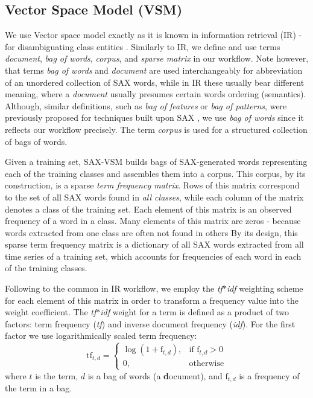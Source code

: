 \documentclass{llncs}
\begin{document}
\subsection{Vector Space Model (VSM)}
We use Vector space model exactly as it is known in information retrieval (IR) - 
for disambiguating class entities \cite{salton}. Similarly to IR, we define and use 
terms \textit{document}, \textit{bag of words}, \textit{corpus}, and 
\textit{sparse matrix} in our workflow. 
Note however, that terms \textit{bag of words} and \textit{document} are used 
interchangeably for abbreviation of an unordered collection of SAX words, while 
in IR these usually bear different meaning, where a \textit{document} usually 
presumes certain words ordering (semantics). 
Although, similar definitions, such as \textit{bag of features} or 
\textit{bag of patterns}, were previously proposed for techniques built upon 
SAX \cite{bag_patterns}, we use \textit{bag of words} since it reflects our 
workflow precisely. The term \textit{corpus} is used for a structured collection 
of bags of words. 

Given a training set, SAX-VSM builds bags of SAX-generated words representing 
each of the training classes and assembles them into a corpus. 
This corpus, by its construction, is a sparse \textit{term frequency matrix}. 
Rows of this matrix correspond to the set of all SAX words found in 
\textit{all classes}, while each column of the matrix denotes a class of the 
training set. Each element of this matrix is an observed frequency of a word
in a class. 
Many elements of this matrix are zeros - because words extracted from one class 
are often not found in others 
By its design, this sparse 
term frequency matrix is a dictionary of all SAX words extracted from all time 
series of a training set, which accounts for frequencies of each word in each of 
the training classes.

Following to the common in IR workflow, we employ the \textit{tf$\ast$idf} weighting 
scheme for each element of this matrix in order to transform a frequency value into
the weight coefficient. 
The \textit{tf$\ast$idf} weight for a term is defined as a 
product of two factors: term frequency (\textit{tf}) and inverse document 
frequency (\textit{idf}). 
For the first factor we use logarithmically scaled term frequency:
\begin{equation}
 \mbox{tf}_{t, d} =  \begin{cases} \log(1 + \mbox{f}_{t,d}), &\mbox{if f}_{t,d}>0  \\
0, & \mbox{otherwise} \end{cases}
\end{equation} 
where $t$ is the term, $d$ is a bag of words (a \textbf{d}ocument), and $\mbox{f}_{t,d}$ 
is a frequency of the term in a bag.
\end{document}
